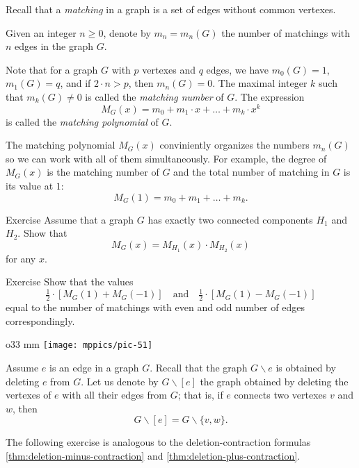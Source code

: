 Recall that a \emph{matching} in a graph is a set of edges without common vertexes.

Given an integer $n\ge0$,
denote by $m_n=m_n(G)$ the number of matchings with $n$ edges in the graph $G$.

Note that for a graph $G$ with $p$ vertexes and $q$ edges, we have 
$m_0(G)=1$, 
$m_1(G)=q$, 
and if $2\cdot n>p$, then $m_n(G)=0$.
The maximal integer $k$ such that $m_k(G)\ne0$ is called the \emph{matching number} of $G$.
The expression 
\[M_G(x)=m_0+m_1\cdot x+\dots +m_k\cdot x^k\]
is called the \emph{matching polynomial} of $G$.

The matching polynomial $M_G(x)$ conviniently organizes the numbers $m_n(G)$ so we can work with all of them simultaneously.
For example, the degree of $M_G(x)$ is the matching number of $G$ and
the total number of matching in $G$ is its value at $1$:  
\[M_G(1)=m_0+m_1+\dots +m_k.\]

\begin{thm}{Exercise}
Assume that a graph $G$ has exactly two connected components $H_1$ and $H_2$.
Show that 
\[M_G(x)=M_{H_1}(x)\cdot M_{H_2}(x)\]
for any $x$.
\end{thm}

\begin{thm}{Exercise}
Show that the values
\[\tfrac12\cdot[M_G(1)+ M_G(-1)]\quad\text{and}\quad\tfrac12\cdot[M_G(1)- M_G(-1)]\]
equal to the number of matchings with even and odd number of edges correspondingly.
\end{thm}

{

\begin{wrapfigure}{o}{33 mm}
\vskip-8mm
\centering
\texttt{[image: mppics/pic-51]}
\vskip-0mm
\end{wrapfigure}

Assume $e$ is an edge in a graph $G$.
Recall that the graph $G\backslash e$ is obtained by deleting $e$ from $G$.
Let us denote by $G\backslash [e]$ the graph obtained by deleting the vertexes of $e$ with all their edges from $G$;
that is, if $e$ connects two vertexes $v$ and $w$, then 
\[G\backslash [e]=G\backslash \{v,w\}.\]

}

The following exercise is analogous to the deletion-contraction formulas \ref{thm:deletion-minus-contraction} and \ref{thm:deletion-plus-contraction}.


